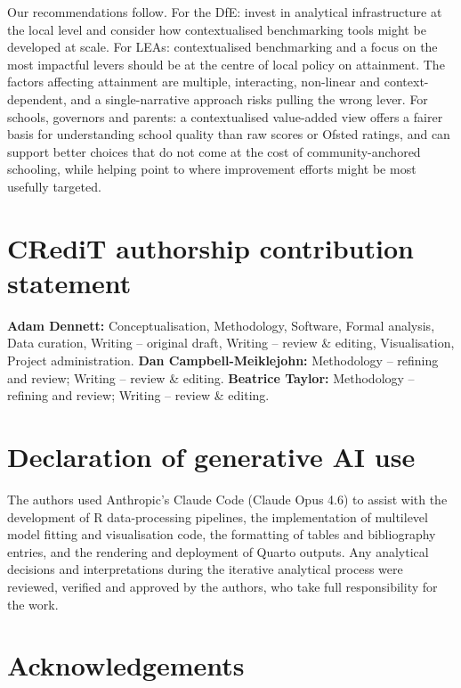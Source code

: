 \documentclass[
  12pt,
  titlepage]{article}
\begin{document}
Our recommendations follow. For the DfE: invest in analytical
infrastructure at the local level and consider how contextualised
benchmarking tools might be developed at scale. For LEAs: contextualised
benchmarking and a focus on the most impactful levers should be at the
centre of local policy on attainment. The factors affecting attainment
are multiple, interacting, non-linear and context-dependent, and a
single-narrative approach risks pulling the wrong lever. For schools,
governors and parents: a contextualised value-added view offers a fairer
basis for understanding school quality than raw scores or Ofsted
ratings, and can support better choices that do not come at the cost of
community-anchored schooling, while helping point to where improvement
efforts might be most usefully targeted.

\section*{CRediT authorship contribution
statement}\label{credit-authorship-contribution-statement}

\textbf{Adam Dennett:} Conceptualisation, Methodology, Software, Formal
analysis, Data curation, Writing -- original draft, Writing -- review \&
editing, Visualisation, Project administration. \textbf{Dan
Campbell-Meiklejohn:} Methodology -- refining and review; Writing --
review \& editing. \textbf{Beatrice Taylor:} Methodology -- refining and
review; Writing -- review \& editing.

\section*{Declaration of generative AI
use}\label{declaration-of-generative-ai-use}

The authors used Anthropic's Claude Code (Claude Opus 4.6) to assist
with the development of R data-processing pipelines, the implementation
of multilevel model fitting and visualisation code, the formatting of
tables and bibliography entries, and the rendering and deployment of
Quarto outputs. Any analytical decisions and interpretations during the
iterative analytical process were reviewed, verified and approved by the
authors, who take full responsibility for the work.

\section*{Acknowledgements}\label{acknowledgements}
\end{document}
